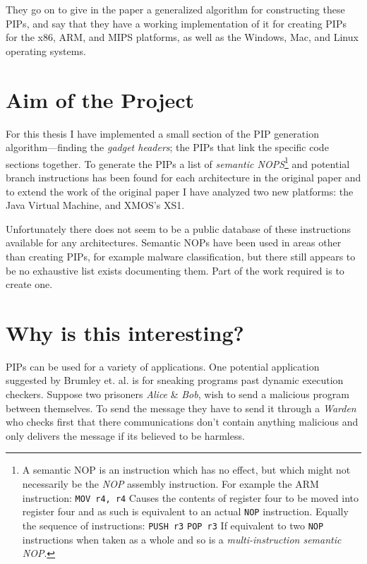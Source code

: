 \documentclass[]{book}
\begin{document}
They go on to give in the paper a generalized algorithm for constructing
these PIPs, and say that they have a working implementation of it for
creating PIPs for the x86, ARM, and MIPS platforms, as well as the
Windows, Mac, and Linux operating systems.

\section{Aim of the Project}

For this thesis I have implemented a small section of the PIP generation
algorithm---finding the \emph{gadget headers}; the PIPs that link the
specific code sections together. To generate the PIPs a list of
\emph{semantic NOPS}\footnote{A semantic NOP is an instruction which has
  no effect, but which might not necessarily be the \emph{NOP} assembly
  instruction. For example the ARM instruction: \lstinline!MOV r4, r4!
  Causes the contents of register four to be moved into register four
  and as such is equivalent to an actual \lstinline!NOP! instruction.
  Equally the sequence of instructions: \lstinline!PUSH r3!
  \lstinline!POP r3! If equivalent to two \lstinline!NOP! instructions
  when taken as a whole and so is a \emph{multi-instruction semantic
  NOP}.} and potential branch instructions has been found for each
architecture in the original paper and to extend the work of the
original paper I have analyzed two new platforms: the Java Virtual
Machine, and XMOS's XS1.

Unfortunately there does not seem to be a public database of these
instructions available for any architectures. Semantic NOPs have been
used in areas other than creating PIPs, for example malware
classification\autocite{Bilar:2007uu}\autocite{Preda:2007ky}, but there
still appears to be no exhaustive list exists documenting them. Part of
the work required is to create one.

\section{Why is this interesting?}

PIPs can be used for a variety of applications. One potential
application suggested by Brumley et. al.\autocite{Cha:2010uh} is for
sneaking programs past dynamic execution checkers. Suppose two prisoners
\emph{Alice} \& \emph{Bob}, wish to send a malicious program between
themselves. To send the message they have to send it through a
\emph{Warden} who checks first that there communications don't contain
anything malicious and only delivers the message if its believed to be
harmless.
\end{document}
